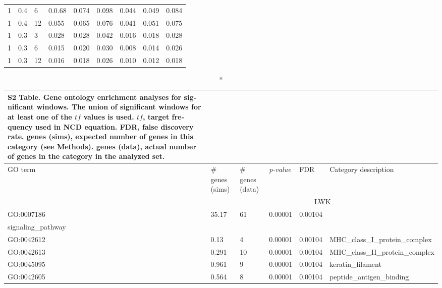 \begin{refsection}
\begin{otherlanguage}{english}
\begin{scriptsize}
\begin{longtable}{lllllllll}
\cellcolor[HTML]{C0C0C0}1 & \cellcolor[HTML]{C0C0C0}0.4 & \cellcolor[HTML]{C0C0C0}6 & 0.0.68 & 0.074 & 0.098 & 0.044 & 0.049 & 0.084 \\
\cellcolor[HTML]{C0C0C0}1 & \cellcolor[HTML]{C0C0C0}0.4 & \cellcolor[HTML]{C0C0C0}12 & 0.055 & 0.065 & 0.076 & 0.041 & 0.051 & 0.075 \\
\cellcolor[HTML]{C0C0C0}1 & \cellcolor[HTML]{C0C0C0}0.3 & \cellcolor[HTML]{C0C0C0}3 & 0.028 & 0.028 & 0.042 & 0.016 & 0.018 & 0.028 \\
\cellcolor[HTML]{C0C0C0}1 & \cellcolor[HTML]{C0C0C0}0.3 & \cellcolor[HTML]{C0C0C0}6 & 0.015 & 0.020 & 0.030 & 0.008 & 0.014 & 0.026 \\
\cellcolor[HTML]{C0C0C0}1 & \cellcolor[HTML]{C0C0C0}0.3 & \cellcolor[HTML]{C0C0C0}12 & 0.016 & 0.018 & 0.026 & 0.010 & 0.012 & 0.018 \\ \hline
\end{longtable}
\end{scriptsize}
\begin{scriptsize}
\begin{longtable}{llllll}
\caption*{\textbf{S2 Table. Gene ontology enrichment analyses for significant windows.} The union of significant windows for at least one of the $tf$ values is used. $tf$, target frequency used in NCD equation. FDR, false discovery rate. genes (sims), expected number of genes in this category (see Methods). genes (data), actual number of genes in the category in the analyzed set.} \\
\toprule
\rowcolor[HTML]{C0C0C0} 
GO term & \# genes (sims) & \#  genes  (data) & \textit{p-value} & FDR & Category description \\ \midrule
& \multicolumn{5}{c}{\cellcolor[HTML]{EFEFEF}LWK} \\
GO:0007186 & 35.17 & 61 & 0.00001 & 0.00104 & \begin{tabular}[c]{@{}l@{}}G-protein\_coupled\_receptor\_ \\ signaling\_pathway\end{tabular} \\
GO:0042612 & 0.13 & 4 & 0.00001 & 0.00104 & MHC\_class\_I\_protein\_complex \\
GO:0042613 & 0.291 & 10 & 0.00001 & 0.00104 & MHC\_class\_II\_protein\_complex \\
GO:0045095 & 0.961 & 9 & 0.00001 & 0.00104 & keratin\_filament \\
GO:0042605 & 0.564 & 8 & 0.00001 & 0.00104 & peptide\_antigen\_binding \\

\end{longtable}
\end{scriptsize}
\end{otherlanguage}
\end{refsection}
